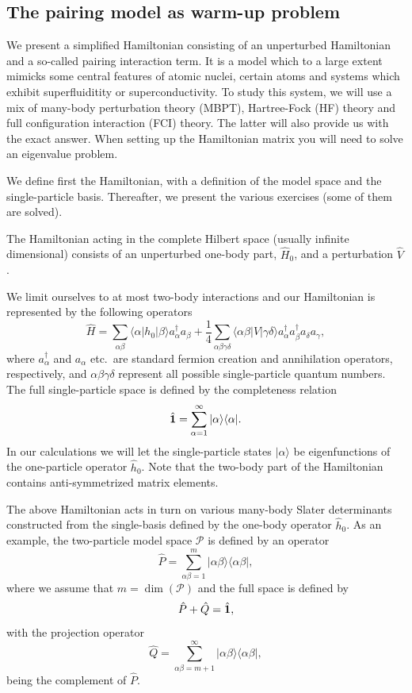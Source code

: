 \documentclass[%
twoside,                 %
final,                   %
10pt]{article}
\begin{document}
\noindent
\subsection{The pairing model as warm-up problem}

We present a simplified Hamiltonian consisting of an unperturbed
Hamiltonian and a so-called pairing interaction term. It is a model
which to a large extent mimicks some central features of atomic
nuclei, certain atoms and systems which exhibit superfluiditity or
superconductivity.  To study this system, we will use a mix of
many-body perturbation theory (MBPT), Hartree-Fock (HF) theory and full
configuration interaction (FCI) theory. The latter will also provide us with
the exact answer.  When setting up the Hamiltonian matrix you will
need to solve an eigenvalue problem.

We define first the Hamiltonian, with a definition of the model space
and the single-particle basis. Thereafter, we present the various
exercises (some of them are solved).


The Hamiltonian acting in the complete Hilbert space (usually infinite
dimensional) consists of an unperturbed one-body part, $\hat{H}_0$,
and a perturbation $\hat{V}$.

We limit ourselves to at most two-body interactions and our Hamiltonian
is represented by the following operators
\[
\hat{H} = \sum_{\alpha\beta}\langle \alpha |h_0|\beta\rangle
a_{\alpha}^{\dagger}a_{\beta}+\frac{1}{4}\sum_{\alpha\beta\gamma\delta}\langle \alpha\beta|
V|\gamma\delta\rangle a_{\alpha}^{\dagger}a_{\beta}^{\dagger}a_{\delta}a_{\gamma},
\]
where $a_{\alpha}^{\dagger}$ and $a_{\alpha}$ etc.~are standard
fermion creation and annihilation operators, respectively, and
$\alpha\beta\gamma\delta$ represent all possible single-particle
quantum numbers.  The full single-particle space is defined by the
completeness relation 
\[
\hat{{\bf 1}} = \sum_{\alpha=1}^{\infty}|\alpha \rangle \langle \alpha|.
\]
In our calculations
we will let the single-particle states $|\alpha\rangle$ be
eigenfunctions of the one-particle operator $\hat{h}_0$. Note that the two-body part of the Hamiltonian 
contains anti-symmetrized matrix elements.


The above Hamiltonian acts in turn on various many-body Slater
determinants constructed from the single-basis defined by the one-body
operator $\hat{h}_0$.  As an example, the two-particle model space
$\mathcal{P}$ is defined by an operator
\[
\hat{P} = \sum_{\alpha\beta =1}^{m}|\alpha\beta \rangle \langle
\alpha\beta|,
\]
where we assume that $m=\dim(\mathcal{P})$ and the full space is
defined by
\[
\hat{P}+\hat{Q}=\hat{{\bf 1}},
\]
with the projection operator
\[
\hat{Q} = \sum_{\alpha\beta =m+1}^{\infty}|\alpha\beta \rangle \langle
\alpha\beta|,
\]
being the complement of $\hat{P}$.
\end{document}
